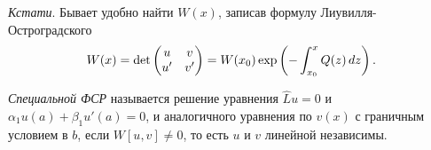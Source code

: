 \textit{Кстати}.  Бывает удобно найти $W(x)$, записав формулу Лиувилля-Остроградского
\begin{equation*}
    W(x) = 
    \det \begin{pmatrix}
        u & v  \\
        u' & v'  \\
    \end{pmatrix}
    =
    W(x_0) \exp\left(
        - \int_{x_0}^{x}  Q(z) \, d z
    \right).
\end{equation*}


\begin{to_def}
    \textit{Специальной ФСР} называется решение уравнения $\hat{L} u = 0$ и $\alpha_1 u(a) + \beta_1 u'(a) = 0$, и аналогичного уравнения по $v(x)$ с граничным условием в $b$, 
    если $W[u, v] \neq 0$, то есть $u$ и $v$ линейной независимы. 
\end{to_def}




